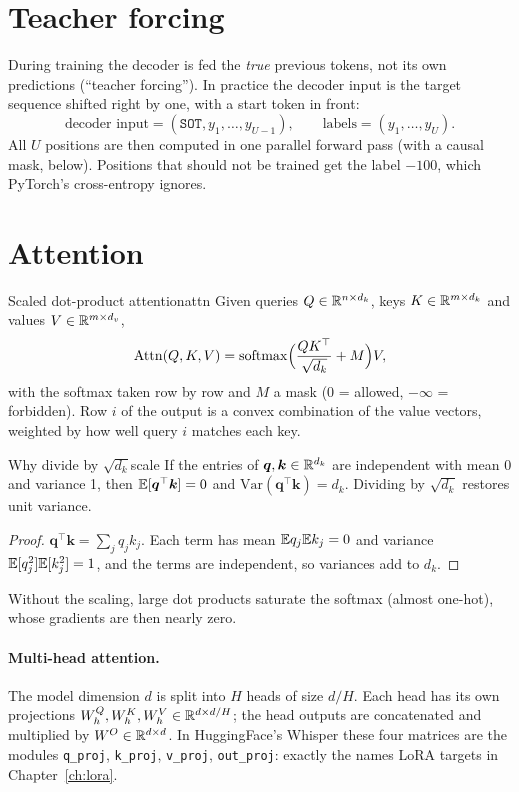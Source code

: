 \section{Teacher forcing}

During training the decoder is fed the \emph{true} previous tokens, not its own predictions (``teacher forcing''). In practice the
decoder input is the target sequence shifted right by one, with a start token in front:
\[
\text{decoder input}=(\texttt{SOT},y_1,\dots,y_{U-1}),\qquad \text{labels}=(y_1,\dots,y_U).
\]
All $U$ positions are then computed in one parallel forward pass (with a causal mask, below). Positions that should not be
trained get the label $-100$, which PyTorch's cross-entropy ignores.

\section{Attention}

\begin{definition}{Scaled dot-product attention}{attn}
Given queries $Q\in\mathbb{R}^{n\times d_k}$, keys $K\in\mathbb{R}^{m\times d_k}$ and values $V\in\mathbb{R}^{m\times d_v}$,
\[
\mathrm{Attn}(Q,K,V)=\operatorname{softmax}\!\Big(\frac{QK^\top}{\sqrt{d_k}}+M\Big)V,
\]
with the softmax taken row by row and $M$ a mask ($0$ = allowed, $-\infty$ = forbidden). Row $i$ of the output is a convex
combination of the value vectors, weighted by how well query $i$ matches each key.
\end{definition}

\begin{proposition}{Why divide by $\sqrt{d_k}$}{scale}
If the entries of $\bm q,\bm k\in\mathbb{R}^{d_k}$ are independent with mean 0 and variance 1, then $\mathbb{E}[\bm q^\top\bm k]=0$ and
$\mathrm{Var}(\bm q^\top\bm k)=d_k$. Dividing by $\sqrt{d_k}$ restores unit variance.
\end{proposition}
\begin{proof}
$\bm q^\top\bm k=\sum_{j}q_jk_j$. Each term has mean $\mathbb{E} q_j\mathbb{E} k_j=0$ and variance $\mathbb{E}[q_j^2]\mathbb{E}[k_j^2]=1$, and the terms are
independent, so variances add to $d_k$.
\end{proof}
Without the scaling, large dot products saturate the softmax (almost one-hot), whose gradients are then nearly zero.

\paragraph{Multi-head attention.} The model dimension $d$ is split into $H$ heads of size $d/H$. Each head has its own
projections $W^Q_h,W^K_h,W^V_h\in\mathbb{R}^{d\times d/H}$; the head outputs are concatenated and multiplied by $W^O\in\mathbb{R}^{d\times d}$. In
HuggingFace's Whisper these four matrices are the modules \texttt{q\_proj}, \texttt{k\_proj}, \texttt{v\_proj}, \texttt{out\_proj}:
exactly the names LoRA targets in Chapter~\ref{ch:lora}.

